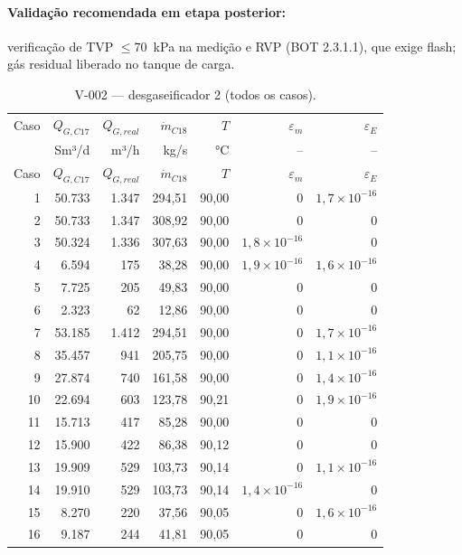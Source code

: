 \documentclass[11pt,a4paper]{article}
\numberwithin{equation}{section}
\numberwithin{table}{section}
\numberwithin{figure}{section}
\begin{document}
\paragraph{Validação recomendada em etapa posterior:} verificação de TVP $\le$70~\si{\kilo\pascal} na medição e RVP (BOT 2.3.1.1), que exige flash; gás residual liberado no tanque de carga.
{\footnotesize\setlength{\tabcolsep}{3.5pt}\begin{longtable}{rrrrrrr}
\caption{V-002 --- desgaseificador 2 (todos os casos).\label{tab:b10}}\\\toprule
Caso & $Q_{G,C17}$ & $Q_{G,real}$ & $\dot m_{C18}$ & $T$ & $\varepsilon_m$ & $\varepsilon_E$\\
 & Sm³/d & m³/h & kg/s & °C & -- & --\\\midrule\endfirsthead
\toprule Caso & $Q_{G,C17}$ & $Q_{G,real}$ & $\dot m_{C18}$ & $T$ & $\varepsilon_m$ & $\varepsilon_E$\\\midrule\endhead
1 & 50.733 & 1.347 & 294,51 & 90,00 & $0$ & $1{,}7\times10^{-16}$\\
2 & 50.733 & 1.347 & 308,92 & 90,00 & $0$ & $0$\\
3 & 50.324 & 1.336 & 307,63 & 90,00 & $1{,}8\times10^{-16}$ & $0$\\
4 & 6.594 & 175 & 38,28 & 90,00 & $1{,}9\times10^{-16}$ & $1{,}6\times10^{-16}$\\
5 & 7.725 & 205 & 49,83 & 90,00 & $0$ & $0$\\
6 & 2.323 & 62 & 12,86 & 90,00 & $0$ & $0$\\
7 & 53.185 & 1.412 & 294,51 & 90,00 & $0$ & $1{,}7\times10^{-16}$\\
8 & 35.457 & 941 & 205,75 & 90,00 & $0$ & $1{,}1\times10^{-16}$\\
9 & 27.874 & 740 & 161,58 & 90,00 & $0$ & $1{,}4\times10^{-16}$\\
10 & 22.694 & 603 & 123,78 & 90,21 & $0$ & $1{,}9\times10^{-16}$\\
11 & 15.713 & 417 & 85,28 & 90,00 & $0$ & $0$\\
12 & 15.900 & 422 & 86,38 & 90,12 & $0$ & $0$\\
13 & 19.909 & 529 & 103,73 & 90,14 & $0$ & $1{,}1\times10^{-16}$\\
14 & 19.910 & 529 & 103,73 & 90,14 & $1{,}4\times10^{-16}$ & $0$\\
15 & 8.270 & 220 & 37,56 & 90,05 & $0$ & $1{,}6\times10^{-16}$\\
16 & 9.187 & 244 & 41,81 & 90,05 & $0$ & $0$\\
\bottomrule\end{longtable}}
\end{document}
